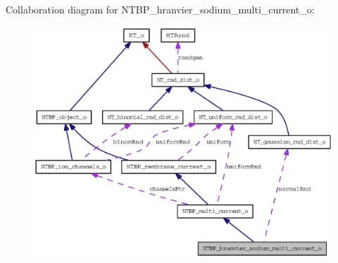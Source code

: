Collaboration diagram for NTBP\_\-hranvier\_\-sodium\_\-multi\_\-current\_\-o:
\nopagebreak
\begin{figure}[H]
\begin{center}
\leavevmode
\includegraphics[width=400pt]{class_n_t_b_p__hranvier__sodium__multi__current__o__coll__graph}
\end{center}
\end{figure}
